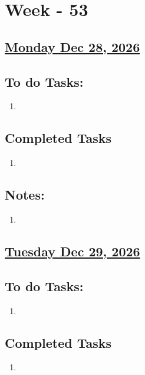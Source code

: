 \section{Week - 53}

\subsection*{\underline{Monday Dec 28, 2026}}
\subsection*{To do Tasks:}
\begin{enumerate}
    \item 
\end{enumerate}
\subsection*{Completed Tasks}
\begin{enumerate}[\ding{52}]  %
    \item 
\end{enumerate}
\subsection*{Notes:}
\begin{enumerate}
    \item 
\end{enumerate}
\subsection*{\underline{Tuesday Dec 29, 2026}}
\subsection*{To do Tasks:}
\begin{enumerate}
    \item  
\end{enumerate}
\subsection*{Completed Tasks}
\begin{enumerate}[\ding{52}]  %
    \item 
\end{enumerate}
